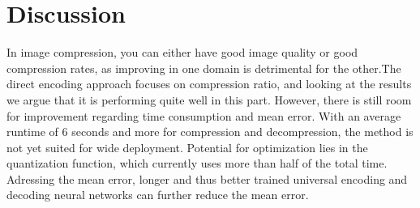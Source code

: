 \section{Discussion} \label{sec:discussion}
In image compression, you can either have good image quality or good compression rates, as improving in one domain is detrimental for the other.\newpage The direct encoding approach focuses on compression ratio, and looking at the results we argue that it is performing quite well in this part. However, there is still room for improvement regarding time consumption and mean error. With an average runtime of 6 seconds and more for compression and decompression, the method is not yet suited for wide deployment. Potential for optimization lies in the quantization function, which currently uses more than half of the total time. Adressing the mean error, longer and thus better trained universal encoding and decoding neural networks can further reduce the mean error. 




